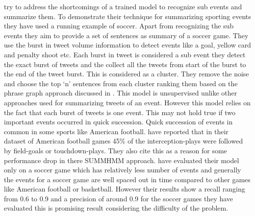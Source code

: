 \citet{Nichols:2012:SSE:2166966.2166999} try to address the shortcomings of a trained model to recognize sub events and summarize them. To demonstrate their technique for summarizing sporting events they have used a running example of soccer. Apart from recognizing the sub events they aim to provide a set of sentences as summary of a soccer game. They use the burst in tweet volume information to detect  events like a goal, yellow card and penalty shoot etc. Each burst in tweet is considered a sub event they detect the exact burst of tweets and the collect all the tweets from start of the burst to the end of the tweet burst. This is considered as a cluster. They remove the noise and choose the top ‘n’ sentences from each cluster ranking them based on the phrase graph approach discussed in \citet{Sharifi:2010:SMA:1857999.1858099}. This model is unsupervised unlike other approaches used for summarizing tweets of an event. However this model relies on the fact that each burst of tweets is one event. This may not hold true if two important events occurred in quick succession. Quick succession of events in common in some sports like American football. \citet{DBLP:conf/icwsm/ChakrabartiP11} have reported that in their dataset of American football games 45\% of the interception-plays were followed by field-goals or touchdown-plays. They also cite this as a reason for some performance drop in there SUMMHMM approach.  \citet{Nichols:2012:SSE:2166966.2166999} have evaluated their model only on a soccer game which has relatively less number of events and generally the events for a soccer game are well spaced out in time compared to other games like American football or basketball. However their results show a recall ranging from 0.6 to 0.9 and a precision of around 0.9 for the soccer games they have evaluated this is promising result considering the difficulty of the problem.

